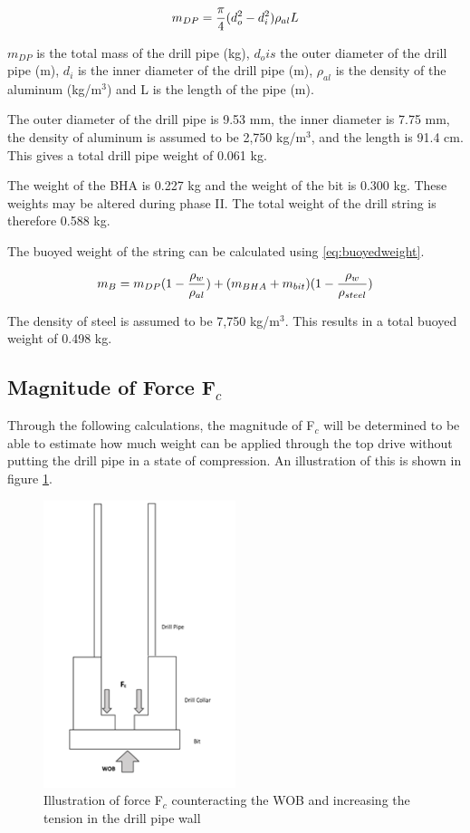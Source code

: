 \begin{equation}
\centering
   m_{DP}= \frac{\pi}{4} (d_o^2-d_i^2) \rho_{al} L
\label{eq:masscollar}
\end{equation}

$m_{DP}$ is the total mass of the drill pipe (kg), $d_o is$ the outer diameter of the drill pipe (m), $d_i$ is the inner diameter of the drill pipe (m), $\rho_{al}$ is the density of the aluminum (kg/m$^3$) and L is the length of the pipe (m).

The outer diameter of the drill pipe is 9.53 mm, the inner diameter is 7.75 mm, the density of aluminum is assumed to be 2,750 kg/m$^3$, and the length is 91.4 cm. This gives a total drill pipe weight of 0.061 kg.

The weight of the BHA is 0.227 kg and the weight of the bit is 0.300 kg. These weights may be altered during phase II. The total weight of the drill string is therefore 0.588 kg.

The buoyed weight of the string can be calculated using \ref{eq:buoyedweight}.

\begin{equation}
\centering
   m_{B}= m_{DP}(1-\frac{\rho_{w}}{\rho_{al}})+(m_{BHA}+m_{bit})(1-\frac{\rho_{w}}{\rho_{steel}})
\label{eq:buoyedweight}
\end{equation}

The density of steel is assumed to be 7,750 kg/m$^3$. This results in a total buoyed weight of 0.498 kg.

\subsection{Magnitude of Force F$_c$}
Through the following calculations, the magnitude of F$_c$ will be determined to be able to estimate how much weight can be applied through the top drive without putting the drill pipe in a state of compression. An illustration of this is shown in figure \ref{fig:strekkstring}.

\begin{figure} [H]
\centering
\includegraphics[width=0.5\textwidth]{figures/strekkstring.png}
\caption{Illustration of force F$_c$ counteracting the WOB and increasing the tension in the drill pipe wall}
\label{fig:strekkstring}
\end{figure}

